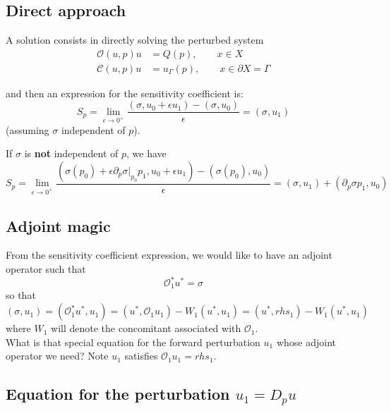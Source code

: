 \documentclass[11pt]{article}
\newcommand{\be}{\begin{equation}}
\newcommand{\ee}{\end{equation}}
\renewcommand{\O}{\mathcal{O}}
\newcommand{\mc}[1]{\mathcal{#1}}
\newcommand{\us}{{u^\ast}}
\begin{document}
\subsection{Direct approach}

A solution consists in directly solving
the perturbed system
\begin{align}
\O(u,p) u &= Q(p), \qquad x\in X \\
\mc{C}(u,p) u &=u_\Gamma(p), \qquad x \in \partial X=\Gamma
\end{align}

and then an expression for the sensitivity coefficient is:
\be
S_p  = \lim_{\epsilon \rightarrow 0^+} \frac{ (\sigma, u_0+\epsilon u_1) - (\sigma, u_0)}{\epsilon} = (\sigma,u_1)
\ee
(assuming $\sigma$ independent of $p$). 

If $\sigma$ is {\bf not} independent of $p$, we have
\be
S_p  = \lim_{\epsilon \rightarrow 0^+} \frac{ (\sigma(p_0) + \epsilon \partial _p \sigma |_{p_0} p_1, u_0+\epsilon u_1) - (\sigma(p_0), u_0)}{\epsilon} = (\sigma,u_1) +  (\partial _p \sigma p_1, u_0)
\ee

\subsection{Adjoint magic}


From the sensitivity coefficient expression, we would like to have an adjoint operator such that
\be
\O^\ast_1 \us = \sigma
\ee
so that
\be
(\sigma,u_1) = (\O_1^\ast \us , u_1 ) =  ( \us , \O_1 u_1 ) - W_1(\us,u_1)   =  ( \us ,rhs_1 ) - W_1(\us,u_1)  
\ee
where $W_1$ will denote the concomitant associated with $\O_1$.\\

What is that special equation for the forward perturbation $u_1$ whose adjoint operator we need?
Note $u_1$ satisfies $\O_1 u_1=rhs_1$.

\subsection{Equation for the perturbation $u_1=D_pu$}
\end{document}
